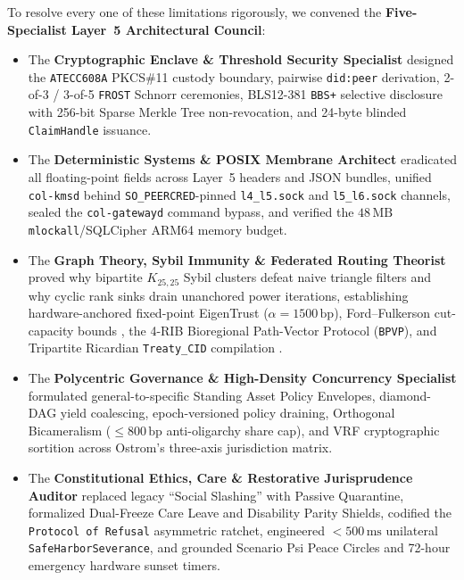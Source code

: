 To resolve every one of these limitations rigorously, we convened the \textbf{Five-Specialist
Layer~5 Architectural Council}:
\begin{itemize}
\item The \textbf{Cryptographic Enclave \& Threshold Security Specialist} designed the
        \texttt{ATECC608A} PKCS\#11 custody boundary, pairwise \texttt{did:peer} derivation,
        2-of-3 / 3-of-5 \texttt{FROST} Schnorr ceremonies, BLS12-381 \texttt{BBS+} selective
        disclosure with 256-bit Sparse Merkle Tree non-revocation, and 24-byte blinded
        \texttt{ClaimHandle} issuance.
\item The \textbf{Deterministic Systems \& POSIX Membrane Architect} eradicated all floating-point
        fields across Layer~5 headers and JSON bundles, unified \texttt{col-kmsd} behind
        \texttt{SO\_PEERCRED}-pinned \texttt{l4\_l5.sock} and \texttt{l5\_l6.sock} channels,
        sealed the \texttt{col-gatewayd} command bypass, and verified the $48\,\mathrm{MB}$
        \texttt{mlockall}/SQLCipher ARM64 memory budget.
\item The \textbf{Graph Theory, Sybil Immunity \& Federated Routing Theorist} proved why
        bipartite $K_{25,25}$ Sybil clusters defeat naive triangle filters and why cyclic rank
        sinks drain unanchored power iterations, establishing hardware-anchored fixed-point
        EigenTrust ($\alpha = 1500\,\mathrm{bp}$), Ford--Fulkerson cut-capacity bounds
        \parencite{ford1956maximal}, the 4-RIB Bioregional Path-Vector Protocol (\texttt{BPVP}),
        and Tripartite Ricardian \texttt{Treaty\_CID} compilation \parencite{grigg2004}.
\item The \textbf{Polycentric Governance \& High-Density Concurrency Specialist} formulated
        general-to-specific Standing Asset Policy Envelopes, diamond-DAG yield coalescing,
        epoch-versioned policy draining, Orthogonal Bicameralism ($\le 800\,\mathrm{bp}$
        anti-oligarchy share cap), and VRF cryptographic sortition \parencite{micali1999vrf}
        across Ostrom's three-axis jurisdiction matrix.
\item The \textbf{Constitutional Ethics, Care \& Restorative Jurisprudence Auditor} replaced
        legacy ``Social Slashing'' with Passive Quarantine, formalized Dual-Freeze Care Leave
        and Disability Parity Shields, codified the \texttt{Protocol of Refusal} asymmetric
        ratchet, engineered $<500\,\mathrm{ms}$ unilateral \texttt{SafeHarborSeverance}, and
        grounded Scenario Psi Peace Circles and 72-hour emergency hardware sunset timers.
\end{itemize}

